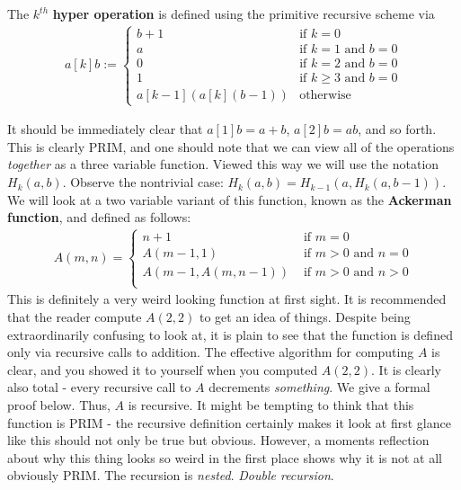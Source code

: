 \begin{definition}
	The $k^{th}$ \textbf{hyper operation} is defined using the primitive recursive scheme via
	\begin{align}
		a[k]b := \begin{cases}
								b+1 & \textrm{if } k=0 \\
								a	& \textrm{if } k=1 \textrm{ and } b=0 \\
								0	& \textrm{if } k=2 \textrm{ and } b=0 \\
								1	& \textrm{if } k \geq 3 \textrm{ and } b=0 \\
								a[k-1](a[k](b-1)) & \textrm{otherwise}
				\end{cases}
	\end{align}
\end{definition}
It should be immediately clear that $a[1]b = a+b$, $a[2]b = ab$, and so forth. This is clearly PRIM, and one should note that we can view all of the operations \textit{together} as a three variable function. Viewed this way we will use the notation $H_k(a,b)$. Observe the nontrivial case: $H_k(a,b) = H_{k-1}(a,H_k(a,b-1))$. We will look at a two variable variant of this function, known as the \textbf{Ackerman function}, and defined as follows:
\begin{align}
    A(m,n) = \begin{cases}
                n+1 & \textrm{ if $m = $0} \\
                A(m-1,1) & \textrm{ if $m>0$ and $n=0$} \\
                A(m-1,A(m,n-1)) & \textrm{ if $m>0$ and $n>0$} \\
             \end{cases}
\end{align}
This is definitely a very weird looking function at first sight. It is recommended that the reader compute $A(2,2)$ to get an idea of things. Despite being extraordinarily confusing to look at, it is plain to see that the function is defined only via recursive calls to addition. The effective algorithm for computing $A$ is clear, and you showed it to yourself when you computed $A(2,2)$. It is clearly also total - every recursive call to $A$ decrements \textit{something}. We give a formal proof below. Thus, $A$ is recursive. It might be tempting to think that this function is PRIM - the recursive definition certainly makes it look at first glance like this should not only be true but obvious. However, a moments reflection about why this thing looks so weird in the first place shows why it is not at all obviously PRIM. The recursion is \textit{nested}. \textit{Double recursion}. 
